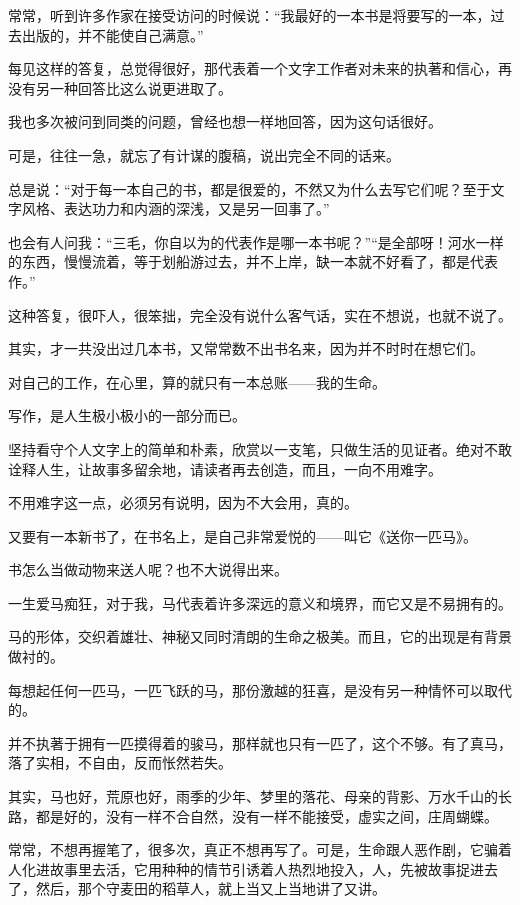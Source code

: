 \par 常常，听到许多作家在接受访问的时候说：“我最好的一本书是将要写的一本，过去出版的，并不能使自己满意。”
\par 每见这样的答复，总觉得很好，那代表着一个文字工作者对未来的执著和信心，再没有另一种回答比这么说更进取了。
\par 我也多次被问到同类的问题，曾经也想一样地回答，因为这句话很好。
\par 可是，往往一急，就忘了有计谋的腹稿，说出完全不同的话来。
\par 总是说：“对于每一本自己的书，都是很爱的，不然又为什么去写它们呢？至于文字风格、表达功力和内涵的深浅，又是另一回事了。”
\par 也会有人问我：“三毛，你自以为的代表作是哪一本书呢？”“是全部呀！河水一样的东西，慢慢流着，等于划船游过去，并不上岸，缺一本就不好看了，都是代表作。”
\par 这种答复，很吓人，很笨拙，完全没有说什么客气话，实在不想说，也就不说了。
\par 其实，才一共没出过几本书，又常常数不出书名来，因为并不时时在想它们。
\par 对自己的工作，在心里，算的就只有一本总账——我的生命。
\par 写作，是人生极小极小的一部分而已。
\par 坚持看守个人文字上的简单和朴素，欣赏以一支笔，只做生活的见证者。绝对不敢诠释人生，让故事多留余地，请读者再去创造，而且，一向不用难字。
\par 不用难字这一点，必须另有说明，因为不大会用，真的。
\par 又要有一本新书了，在书名上，是自己非常爱悦的——叫它《送你一匹马》。
\par 书怎么当做动物来送人呢？也不大说得出来。
\par 一生爱马痴狂，对于我，马代表着许多深远的意义和境界，而它又是不易拥有的。
\par 马的形体，交织着雄壮、神秘又同时清朗的生命之极美。而且，它的出现是有背景做衬的。
\par 每想起任何一匹马，一匹飞跃的马，那份激越的狂喜，是没有另一种情怀可以取代的。
\par 并不执著于拥有一匹摸得着的骏马，那样就也只有一匹了，这个不够。有了真马，落了实相，不自由，反而怅然若失。
\par 其实，马也好，荒原也好，雨季的少年、梦里的落花、母亲的背影、万水千山的长路，都是好的，没有一样不合自然，没有一样不能接受，虚实之间，庄周蝴蝶。
\par 常常，不想再握笔了，很多次，真正不想再写了。可是，生命跟人恶作剧，它骗着人化进故事里去活，它用种种的情节引诱着人热烈地投入，人，先被故事捉进去了，然后，那个守麦田的稻草人，就上当又上当地讲了又讲。
